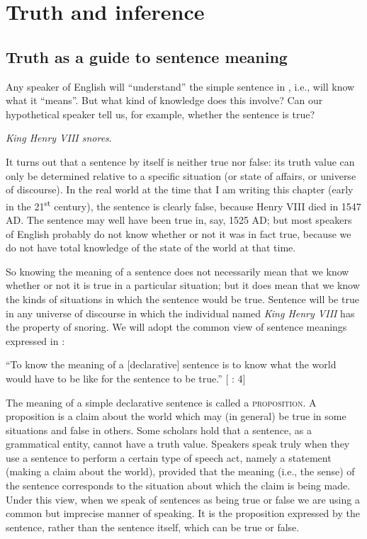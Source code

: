 \chapter{Truth and inference}\label{sec:3}

\section{Truth as a guide to sentence meaning}\label{sec:3.1}

Any speaker of English will “understand” the simple sentence in , i.e., will know what it “means”. But what kind of knowledge does this involve? Can our hypothetical speaker tell us, for example, whether the sentence is true?


\ea \label{ex:3.1}
\textit{King Henry VIII snores}.
\z


It turns out that a sentence by itself is neither true nor false: its truth value can only be determined relative to a specific situation (or state of affairs, or universe of discourse). In the real world at the time that I am writing this chapter (early in the 21\textsuperscript{st} century), the sentence is clearly false, because Henry VIII died in 1547 AD. The sentence may well have been true in, say, 1525 AD; but most speakers of English probably do not know whether or not it was in fact true, because we do not have total knowledge of the state of the world at that time.



So knowing the meaning of a sentence does not necessarily mean that we know whether or not it is true in a particular situation; but it does mean that we know the kinds of situations in which the sentence would be true. Sentence  will be true in any universe of discourse in which the individual named \textit{King Henry VIII} has the property of snoring. We will adopt the common view of sentence meanings expressed in :


\ea \label{ex:3.2}
“To know the meaning of a [declarative] sentence is to know what the world would have to be like for the sentence to be true.”  [ \citealt{DowtyEtAl1981}: 4]
\z


The meaning of a simple declarative sentence is called a \textsc{proposition}. A proposition is a claim about the world which may (in general) be true in some situations and false in others. Some scholars hold that a sentence, as a grammatical entity, cannot have a truth value. Speakers speak truly when they use a sentence to perform a certain type of speech act, namely a statement (making a claim about the world), provided that the meaning (i.e., the sense) of the sentence corresponds to the situation about which the claim is being made. Under this view, when we speak of sentences as being true or false we are using a common but imprecise manner of speaking. It is the proposition expressed by the sentence, rather than the sentence itself, which can be true or false.



